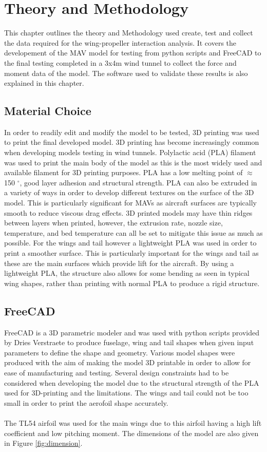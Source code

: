 \graphicspath{{./Figs/}}

\chapter{Theory and Methodology}
This chapter outlines the theory and Methodology used create, test and collect the data required for the wing-propeller interaction analysis. It covers the developement of the MAV model for testing from python scripts and FreeCAD to the final testing completed in a 3x4m wind tunnel to collect the force and moment data of the model. The software used to validate these results is also explained in this chapter. 

\section{Material Choice}
In order to readily edit and modify the model to be tested, 3D printing was used to print the final developed model. 3D printing has become increasingly common when developing models testing in wind tunnels. Polylactic acid (PLA) filament was used to print the main body of the model as this is the most widely used and available filament for 3D printing purposes. PLA has a low melting point of $\approx$ 150 $^{\circ}$, good layer adhesion and structural strength. PLA can also be extruded in a variety of ways in order to develop different textures on the surface of the 3D model. This is particularly significant for MAVs as aircraft surfaces are typically smooth to reduce viscous drag effects. 3D printed models may have thin ridges between layers when printed, however, the extrusion rate, nozzle size, temperature, and bed temperature can all be set to mitigate this issue as much as possible. For the wings and tail however a lightweight PLA was used in order to print a smoother surface. This is particularly important for the wings and tail as these are the main surfaces which provide lift for the aircraft. By using a lightweight PLA, the structure also allows for some bending as seen in typical wing shapes, rather than printing with normal PLA to produce a rigid structure. 


\section{FreeCAD}
FreeCAD is a 3D parametric modeler and was used with python scripts provided by Dries Verstraete to produce fuselage, wing and tail shapes when given input parameters to define the shape and geometry. Various model shapes were produced with the aim of making the model 3D printable in order to allow for ease of manufacturing and testing. Several design constraints had to be considered when developing the model due to the structural strength of the PLA used for 3D-printing and the limitations. The wings and tail could not be too small in order to print the aerofoil shape accurately.\\
\\ The TL54 airfoil was used for the main wings due to this airfoil having a high lift coefficient and low pitching moment. The dimensions of the model are also given in Figure \ref{fig:dimension}.

